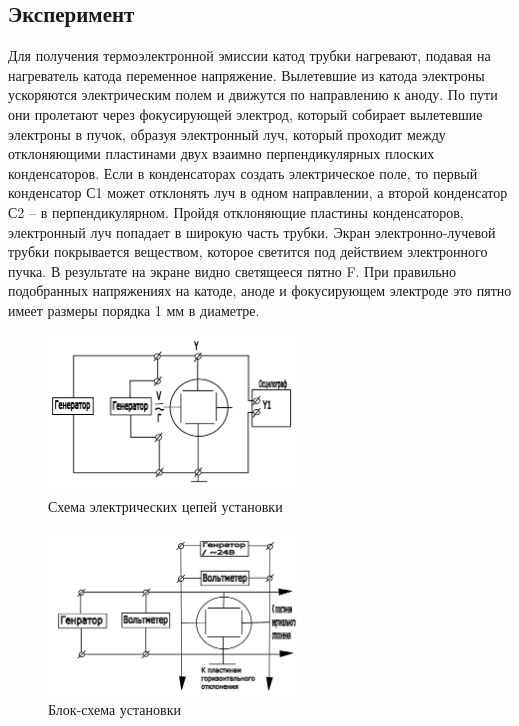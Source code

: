 \subsection{Эксперимент}
Для получения термоэлектронной эмиссии катод трубки нагревают, подавая на нагреватель катода переменное напряжение. Вылетевшие из катода электроны ускоряются электрическим полем и движутся по направлению к аноду. По пути они пролетают через фокусирующей электрод, который собирает вылетевшие электроны в пучок, образуя электронный луч, который проходит между отклоняющими пластинами двух взаимно перпендикулярных плоских конденсаторов. Если в конденсаторах создать электрическое поле, то первый конденсатор С1 может отклонять луч в одном направлении, а второй конденсатор С2 – в перпендикулярном. Пройдя отклоняющие пластины конденсаторов, электронный луч попадает в широкую часть трубки. Экран электронно-лучевой трубки покрывается веществом, которое светится под действием электронного пучка. В результате на экране видно светящееся пятно F. При правильно подобранных напряжениях на катоде, аноде и фокусирующем электроде это пятно имеет размеры порядка 1 мм в диаметре.
\begin{figure}[ht!]
\centering
\includegraphics[width=0.6\textwidth]{Схема электрических цепей установки.pdf}
\caption{Схема электрических цепей установки}
\label{fig:sketch}
\end{figure}

\begin{figure}[ht!]
\centering
\includegraphics[width=0.6\textwidth]{Блок-схема установки.pdf}
\caption{Блок-схема установки}
\label{fig:sketch}
\end{figure}

